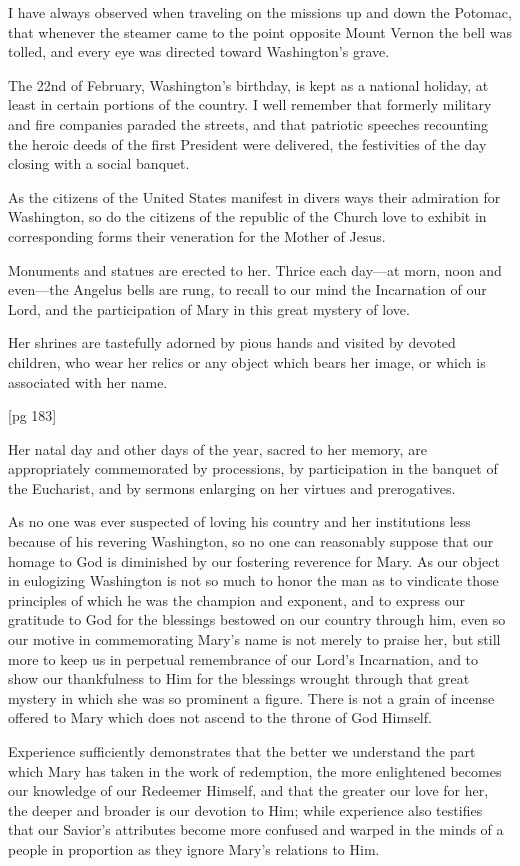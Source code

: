 I have always observed when traveling on the
missions up and down the Potomac, that whenever
the steamer came to the point opposite Mount
Vernon the bell was tolled, and every eye was
directed toward Washington's grave.

The 22nd of February, Washington's birthday,
is kept as a national holiday, at least in certain
portions of the country. I well remember that
formerly military and fire companies paraded the
streets, and that patriotic speeches recounting the
heroic deeds of the first President were delivered,
the festivities of the day closing with a social
banquet.

As the citizens of the United States manifest in
divers ways their admiration for Washington, so
do the citizens of the republic of the Church love
to exhibit in corresponding forms their veneration
for the Mother of Jesus.

Monuments and statues are erected to her.
Thrice each day—at morn, noon and even—the
Angelus bells are rung, to recall to our mind the
Incarnation of our Lord, and the participation of
Mary in this great mystery of love.

Her shrines are tastefully adorned by pious
hands and visited by devoted children, who wear
her relics or any object which bears her image,
or which is associated with her name.

[pg 183]

Her natal day and other days of the year, sacred
to her memory, are appropriately commemorated
by processions, by participation in the banquet of
the Eucharist, and by sermons enlarging on her
virtues and prerogatives.

As no one was ever suspected of loving his country
and her institutions less because of his revering
Washington, so no one can reasonably suppose
that our homage to God is diminished by our fostering
reverence for Mary. As our object in eulogizing
Washington is not so much to honor the man
as to vindicate those principles of which he was the
champion and exponent, and to express our gratitude
to God for the blessings bestowed on our country
through him, even so our motive in commemorating
Mary's name is not merely to praise her,
but still more to keep us in perpetual remembrance
of our Lord's Incarnation, and to show our
thankfulness to Him for the blessings wrought
through that great mystery in which she was so
prominent a figure. There is not a grain of incense
offered to Mary which does not ascend to the
throne of God Himself.

Experience sufficiently demonstrates that the
better we understand the part which Mary has
taken in the work of redemption, the more enlightened
becomes our knowledge of our Redeemer
Himself, and that the greater our love for her, the
deeper and broader is our devotion to Him; while
experience also testifies that our Savior's attributes
become more confused and warped in the
minds of a people in proportion as they ignore
Mary's relations to Him.

